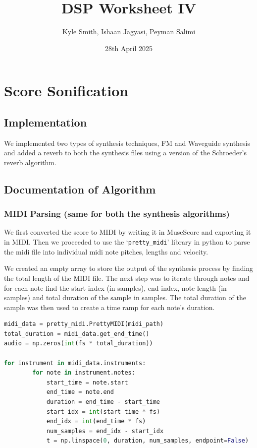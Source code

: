 \documentclass[11pt]{article}
\title{\textbf{DSP Worksheet IV}}
\author{Kyle Smith, Ishaan Jagyasi, Peyman Salimi}
\date{28th April 2025}
\begin{document}
\maketitle

\section{Score Sonification}

\subsection{Implementation}

We implemented two types of synthesis techniques, FM and Waveguide synthesis and added a reverb to both the synthesis files using a version of the Schroeder's reverb algorithm. 

\subsection{Documentation of Algorithm}

\subsubsection{MIDI Parsing (same for both the synthesis algorithms)}

We first converted the score to MIDI by writing it in MuseScore and exporting it in MIDI. Then we proceeded to use the `\texttt{pretty\_midi}' library in python to parse the midi file into individual midi note pitches, lengths and velocity. 

We created an empty array to store the output of the synthesis process by finding the total length of the MIDI file. The next step was to iterate through notes and for each note find the start index (in samples), end index, note length (in samples) and total duration of the sample in samples. The total duration of the sample was then used to create a time ramp for each note's duration. 

\begin{lstlisting}[language= Python]
midi_data = pretty_midi.PrettyMIDI(midi_path)
total_duration = midi_data.get_end_time()
audio = np.zeros(int(fs * total_duration))

for instrument in midi_data.instruments:
        for note in instrument.notes:
            start_time = note.start
            end_time = note.end
            duration = end_time - start_time
            start_idx = int(start_time * fs)
            end_idx = int(end_time * fs)
            num_samples = end_idx - start_idx
            t = np.linspace(0, duration, num_samples, endpoint=False)
\end{lstlisting}
\end{document}
